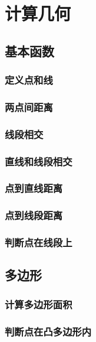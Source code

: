 \documentclass[twocolumn,a4]{article}%
\begin{document}
\section{计算几何}
\subsection{基本函数}
    \subsubsection{定义点和线}
    
    \subsubsection{两点间距离}
    
    \subsubsection{线段相交}
    
    \subsubsection{直线和线段相交}
    
    \subsubsection{点到直线距离}
    
    \subsubsection{点到线段距离}
    
    \subsubsection{判断点在线段上}
    
\subsection{多边形}
    \subsubsection{计算多边形面积}
    
    \subsubsection{判断点在凸多边形内}
    
\end{document}
